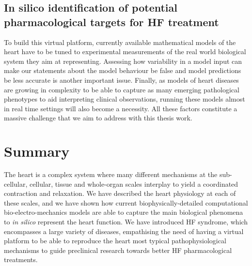 \subsection{In silico identification of potential pharmacological targets for HF treatment}
To build this virtual platform, currently available mathematical models of the heart have to be tuned to experimental measurements of the real world biological system they aim at representing. Assessing how variability in a model input can make our statements about the model behaviour be false and model predictions be less accurate is another important issue. Finally, as models of heart diseases are growing in complexity to be able to capture as many emerging pathological phenotypes to aid interpreting clinical observations, running these models almost in real time settings will also become a necessity. All these factors constitute a massive challenge that we aim to address with this thesis work.


%
%
%
\section{Summary}\label{sec:ch1summary}
The heart is a complex system where many different mechanisms at the sub-cellular, cellular, tissue and whole-organ scales interplay to yield a coordinated contraction and relaxation. We have described the heart physiology at each of these scales, and we have shown how current biophysically-detailed computational bio-electro-mechanics models are able to capture the main biological phenomena to \textit{in silico} represent the heart function. We have introduced HF syndrome, which encompasses a large variety of diseases, empathising the need of having a virtual platform to be able to reproduce the heart most typical pathophysiological mechanisms to guide preclinical research towards better HF pharmacological treatments.


